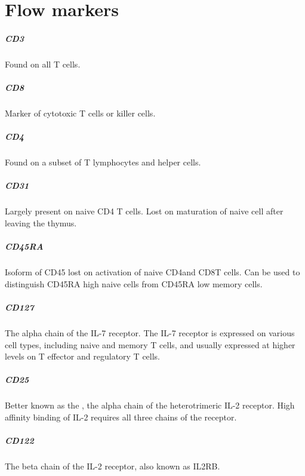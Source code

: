 \chapter{\label{appendix:flowsorting}{Flow markers}}

\paragraph{CD3} Found on all T cells.

\paragraph{CD8} Marker of cytotoxic T cells or killer cells.

\paragraph{CD4} Found on a subset of T lymphocytes and helper cells.

\paragraph{CD31} Largely present on naive CD4 T cells.
Lost on maturation of naive cell after leaving the thymus.

\paragraph{CD45RA} Isoform of CD45 lost on activation of naive CD4\positive and CD8\positive T cells.
Can be used to distinguish CD45RA high naive cells from CD45RA low memory cells.

\paragraph{CD127}
The alpha chain of the IL-7 receptor.
The IL-7 receptor is expressed on various cell types, including naive and memory T cells,
and usually expressed at higher levels on T effector and regulatory T cells.

\paragraph{CD25}
Better known as the , the alpha chain of the heterotrimeric IL-2 receptor.
High affinity binding of IL-2 requires all three chains of the receptor.

\paragraph{CD122}
The beta chain of the IL-2 receptor, also known as IL2RB.

